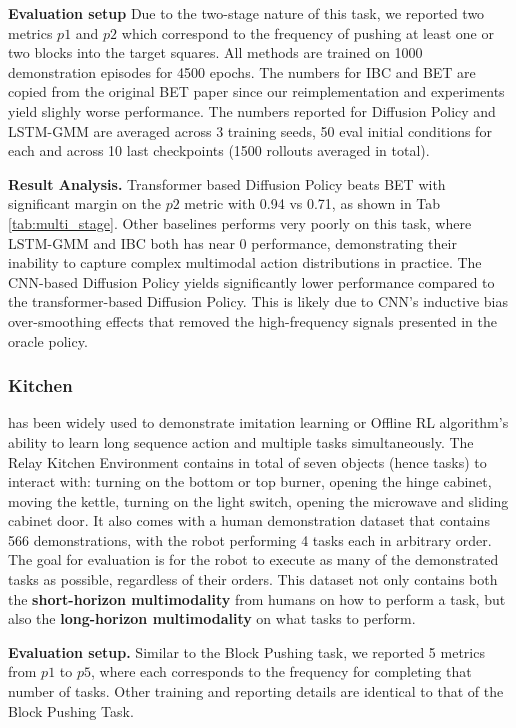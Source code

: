 \textbf{Evaluation setup} Due to the two-stage nature of this task, we reported two metrics $p1$ and $p2$ which correspond to the frequency of pushing at least one or two blocks into the target squares. All methods are trained on 1000 demonstration episodes for 4500 epochs. The numbers for IBC and BET are copied from the original BET paper \cite{bet} since our reimplementation and experiments yield slighly worse performance. The numbers reported for Diffusion Policy and LSTM-GMM are averaged across 3 training seeds, 50 eval initial conditions for each and across 10 last checkpoints (1500 rollouts averaged in total).

\textbf{Result Analysis.} Transformer based Diffusion Policy beats BET \cite{bet} with significant margin on the $p2$ metric with 0.94 vs 0.71, as shown in Tab \ref{tab:multi_stage}. Other baselines performs very poorly on this task, where LSTM-GMM and IBC both has near 0 performance, demonstrating their inability to capture complex multimodal action distributions in practice. The CNN-based Diffusion Policy yields significantly lower performance compared to the transformer-based Diffusion Policy. This is likely due to CNN's inductive bias over-smoothing effects that removed the high-frequency signals presented in the oracle policy.

\subsubsection{\textbf{Kitchen}} has been widely used to demonstrate imitation learning or Offline RL algorithm's ability to learn long sequence action and multiple tasks simultaneously. The Relay Kitchen Environment \cite{gupta2019relay} contains in total of seven objects (hence tasks) to interact with: turning on the bottom or top burner, opening the hinge cabinet, moving the kettle, turning on the light switch, opening the microwave and sliding cabinet door. It also comes with a human demonstration dataset that contains 566 demonstrations, with the robot performing 4 tasks each in arbitrary order. The goal for evaluation is for the robot to execute as many of the demonstrated tasks as possible, regardless of their orders. This dataset not only contains both the \textbf{short-horizon multimodality} from humans on how to perform a task, but also the \textbf{long-horizon multimodality} on what tasks to perform.

\textbf{Evaluation setup.} Similar to the Block Pushing task, we reported 5 metrics from $p1$ to $p5$, where each corresponds to the frequency for completing that number of tasks. Other training and reporting details are identical to that of the Block Pushing Task.

